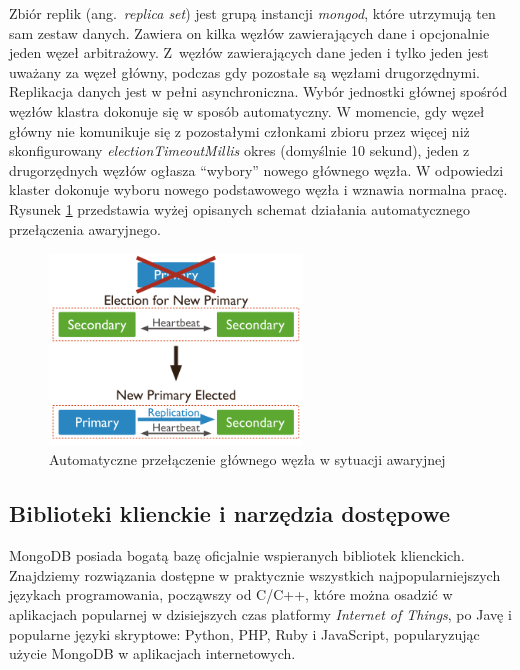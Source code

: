 Zbiór replik (ang.~\textit{replica set}) jest grupą instancji \textit{mongod}, które utrzymują ten sam zestaw danych.
Zawiera on kilka węzłów zawierających dane i opcjonalnie jeden węzeł arbitrażowy.
Z~węzłów zawierających dane jeden i tylko jeden jest uważany za węzeł główny, podczas gdy pozostałe są węzłami drugorzędnymi.
Replikacja danych jest w pełni asynchroniczna.
Wybór jednostki głównej spośród węzłów klastra dokonuje się w sposób automatyczny.
W momencie, gdy węzeł główny nie komunikuje się z pozostałymi członkami zbioru przez więcej niż skonfigurowany \textit{electionTimeoutMillis} okres (domyślnie 10 sekund), jeden z drugorzędnych węzłów ogłasza \enquote{wybory} nowego głównego węzła.
W odpowiedzi klaster dokonuje wyboru nowego podstawowego węzła i wznawia normalna pracę. Rysunek \ref{fig:mongoAutoFailover} przedstawia wyżej opisanych schemat działania automatycznego przełączenia awaryjnego.

\begin{figure}[!ht]
\centering
\includegraphics[width=0.6\textwidth]{figures/replica-set-trigger-election.png}
\caption{Automatyczne przełączenie głównego węzła w sytuacji awaryjnej \cite{MongoDBReplication}}
\label{fig:mongoAutoFailover}
\end{figure}

\subsection{Biblioteki klienckie i narzędzia dostępowe}

MongoDB posiada bogatą bazę oficjalnie wspieranych bibliotek klienckich.
Znajdziemy rozwiązania dostępne w praktycznie wszystkich najpopularniejszych językach programowania, począwszy od C/C++, które można osadzić w aplikacjach popularnej w dzisiejszych czas platformy \textit{Internet of Things}, po Javę i popularne języki skryptowe: Python, PHP, Ruby i JavaScript, popularyzując użycie MongoDB w aplikacjach internetowych.

